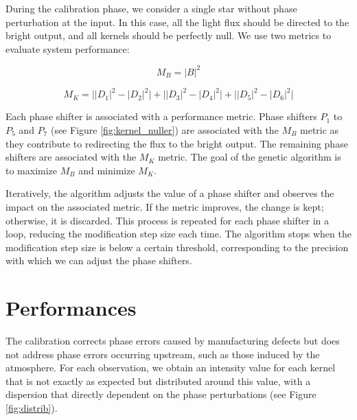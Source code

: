 \documentclass[]{spie}  %
\begin{document}
During the calibration phase, we consider a single star without phase perturbation at the input. In this case, all the light flux should be directed to the bright output, and all kernels should be perfectly null. We use two metrics to evaluate system performance:

\begin{equation}
    M_B = |B|^2
\end{equation}

\begin{equation}
    M_K = \Big||D_1|^2 - |D_2|^2\Big|+\Big||D_3|^2 - |D_4|^2\Big|+\Big||D_5|^2 - |D_6|^2\Big|
\end{equation}

Each phase shifter is associated with a performance metric. Phase shifters $P_1$ to $P_5$ and $P_7$ (see Figure \ref{fig:kernel_nuller}) are associated with the $M_B$ metric as they contribute to redirecting the flux to the bright output. The remaining phase shifters are associated with the $M_K$ metric. The goal of the genetic algorithm is to maximize $M_B$ and minimize $M_K$.

Iteratively, the algorithm adjusts the value of a phase shifter and observes the impact on the associated metric. If the metric improves, the change is kept; otherwise, it is discarded. This process is repeated for each phase shifter in a loop, reducing the modification step size each time. The algorithm stops when the modification step size is below a certain threshold, corresponding to the precision with which we can adjust the phase shifters.

\section{Performances}

The calibration corrects phase errors caused by manufacturing defects but does not address phase errors occurring upstream, such as those induced by the atmosphere. For each observation, we obtain an intensity value for each kernel that is not exactly as expected but distributed around this value, with a dispersion that directly dependent on the phase perturbations (see Figure \ref{fig:distrib}).
\end{document}
